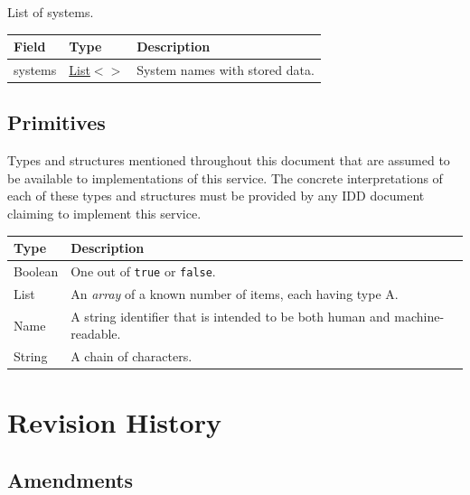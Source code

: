 \documentclass[a4paper]{arrowhead}
\newcommand{\pdef}[1]{{\textcolor{ArrowheadGrey}{#1\label{sec:model:primitives:#1}\label{sec:model:primitives:#1s}\label{sec:model:primitives:#1es}}}}
\newcommand{\pref}[1]{{\textcolor{ArrowheadGrey}{\hyperref[sec:model:primitives:#1]{#1}}}}
\begin{document}

List of systems.


\noindent\begin{tabularx}{\textwidth}{| >{\raggedright\arraybackslash}p{3.9cm} | >{\raggedright\arraybackslash\small}p{5.3cm} | X |} \hline
\rowcolor{gray!33} Field & Type & Description \\ \hline
systems & \pref{List}$<$\allowbreak{}\pref{String}$>$ & System names with stored data. \\ \hline
\end{tabularx}



\subsection{Primitives}
\label{sec:model:primitives}

Types and structures mentioned throughout this document that are assumed to be available to implementations of this service.
The concrete interpretations of each of these types and structures must be provided by any IDD document claiming to implement this service.

\noindent\begin{tabularx}{\textwidth}{| p{4.6cm} | X |} \hline
\rowcolor{gray!33} Type & Description \\ \hline
\pdef{Boolean} & One out of \texttt{true} or \texttt{false}. \\ \hline
\pdef{List} & An \textit{array} of a known number of items, each having type A. \\ \hline
\pdef{Name} & A string identifier that is intended to be both human and machine-readable. \\ \hline
\pdef{String} & A chain of characters. \\ \hline
\end{tabularx}

\newpage




\newpage

\section{Revision History}
\subsection{Amendments}
\end{document}
